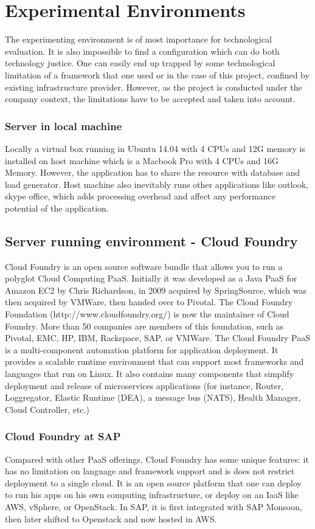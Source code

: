 \chapter{Experimental Environments}

The experimenting environment is of most importance for technological evaluation. It is also impossible to find a configuration which can do both technology justice. One can easily end up trapped by some technological limitation of a framework that one used or in the case of this project, confined by existing infrastructure provider. However, as the project is conducted under the company context, the limitations have to be accepted and taken into account. 

\subsection{Server in local machine}
Locally a virtual box running in Ubuntu 14.04 with 4 CPUs and 12G memory is installed on host machine which is a Macbook  Pro with 4 CPUs and 16G Memory. However, the application has to share the resource with database and load generator. Host machine also inevitably runs other applications like outlook, skype office, which adds processing overhead and affect any performance potential of the application. 

\section{Server running environment -  Cloud Foundry}
Cloud Foundry is an open source software bundle that allows you to run a polyglot Cloud Computing \ac{PaaS}. Initially it was developed as a Java \ac{PaaS} for Amazon EC2 by Chris Richardson, in 2009 acquired by SpringSource, which was then acquired by VMWare, then handed over to Pivotal.
The Cloud Foundry Foundation (http://www.cloudfoundry.org/) is now the maintainer of Cloud Foundry. More than 50 companies are members of this foundation, such as Pivotal, EMC, HP, IBM, Rackspace, SAP, or VMWare.
The Cloud Foundry PaaS is a multi-component automation platform for application deployment. It provides a scalable runtime environment that can support most frameworks and languages that run on Linux. It also contains many components that simplify deployment and release of microservices applications (for instance, Router, Loggregator, Elastic Runtime (\ac{DEA}), a message bus (NATS), Health Manager, Cloud Controller, etc.)

\subsection{Cloud Foundry at SAP}
Compared with other PaaS offerings, Cloud Foundry has some unique features: it has no limitation on language and framework support and is does not restrict deployment to a single cloud.  It is an open source platform that one can deploy to run his apps on his own computing infrastructure, or deploy on an IaaS like \ac{AWS}, vSphere, or OpenStack. In SAP, it is first integrated with SAP Monsoon, then later shifted to Openstack and now hosted in \ac{AWS}. 

